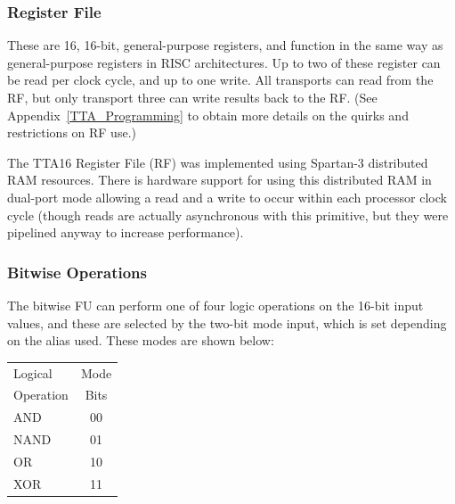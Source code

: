 \subsubsection{Register File}

% 

These are 16, 16-bit, general-purpose registers, and function in the same way as
general-purpose registers in RISC architectures. Up to two of these register can
be read per clock cycle, and up to one write. All transports can read from the
RF, but only transport three can write results back to the RF. (See
Appendix~\ref{TTA_Programming} to obtain more details on the quirks and
restrictions on RF use.)

The TTA16 Register File (RF) was implemented using Spartan-3 distributed RAM
resources. There is hardware support for using this distributed RAM in
dual-port mode allowing a read and a write to occur within each processor clock
cycle (though reads are actually asynchronous with this primitive, but they
were pipelined anyway to increase performance).


\subsubsection{Bitwise Operations}
\label{TTA_Bitwise}


The bitwise FU can perform one of four logic operations on the 16-bit input
values, and these are selected by the two-bit mode input, which is set
depending on the alias used. These modes are shown below:

\begin{center}
\begin{tabular}{l c}
\multicolumn{1}{l}{Logical} & Mode \\
Operation & Bits \\
\hline
AND		& 00 \\
NAND	& 01 \\
OR		& 10 \\
XOR		& 11 \\
\end{tabular}
\end{center}

